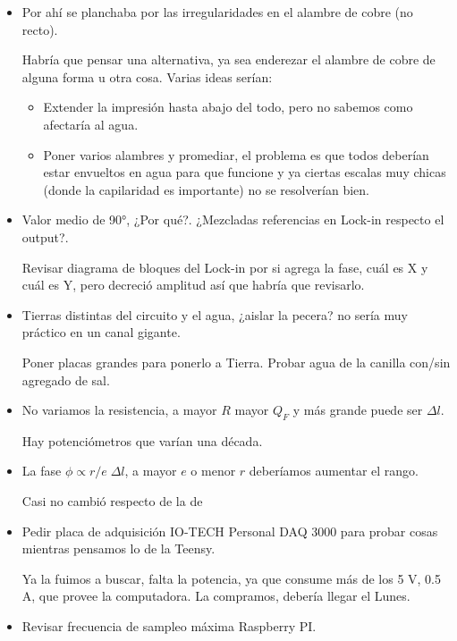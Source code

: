 \begin{itemize}
	\item Por ahí se planchaba por las irregularidades en el alambre de cobre (no recto).

	Habría que pensar una alternativa, ya sea enderezar el alambre de cobre de alguna forma u otra cosa. Varias ideas serían:
	\begin{itemize}
		\item Extender la impresión hasta abajo del todo, pero no sabemos como afectaría al agua.
		\item Poner varios alambres y promediar, el problema es que todos deberían estar envueltos en agua para que funcione y ya ciertas escalas muy chicas (donde la capilaridad es importante) no se resolverían bien.
	\end{itemize}	
	
	\item Valor medio de 90°, ¿Por qué?. ¿Mezcladas referencias en Lock-in respecto el output?.  
	
	Revisar diagrama de bloques del Lock-in por si agrega la fase, cuál es X y cuál es Y, pero decreció amplitud así que habría que revisarlo.
	
	\item Tierras distintas del circuito y el agua, ¿aislar la pecera? no sería muy práctico en un canal gigante. 
	
	Poner placas grandes para ponerlo a Tierra. Probar agua de la canilla con/sin agregado de sal.
	
	\item No variamos la resistencia, a mayor $R$ mayor $Q_F$ y más grande puede ser $\Delta l$. 
	
	Hay potenciómetros que varían una década.
	
	\item La fase $\phi \propto r/e\;\Delta l$, a mayor $e$ o menor $r$ deberíamos aumentar el rango.
	
	Casi no cambió respecto de la de \cite{gordillozavaletaNonpropagatingHydrodynamicSolitons2012}
	
	\item Pedir placa de adquisición IO-TECH Personal DAQ 3000 para probar cosas mientras pensamos lo de la Teensy.
	
	Ya la fuimos a buscar, falta la potencia, ya que consume más de los 5 V, 0.5 A, que provee la computadora. La compramos, debería llegar el Lunes.
	
	\item Revisar frecuencia de sampleo máxima Raspberry PI.
	

\end{itemize}
